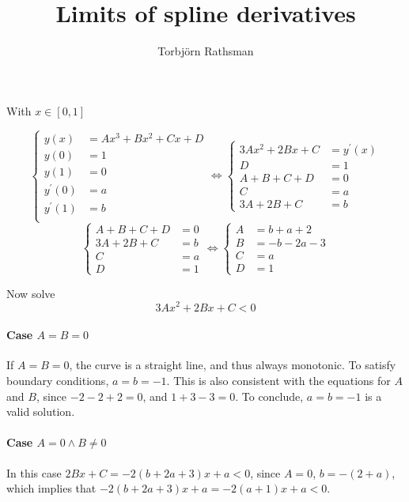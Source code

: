 \documentclass[a4paper, 11pt]{scrartcl}
\title{Limits of spline derivatives}
\author{Torbjörn Rathsman}
\begin{document}
\maketitle

With $x\in[0, 1]$

\[
\left\{
\begin{aligned}
 y(x) &= Ax^3 + Bx^2 + Cx + D\\
 y(0) &= 1\\
 y(1) &= 0\\
 y^\prime(0) &= a \\
 y^\prime(1) &= b \\
\end{aligned}
\right.
\iff
\left\{
\begin{aligned}
3Ax^2 + 2Bx + C &= y^\prime(x)\\
D &= 1 \\
A + B + C + D &= 0 \\
C &= a \\
3A + 2B + C &= b
\end{aligned}
\right.
\]
\[
 \left\{
\begin{aligned}
A + B + C + D &= 0 \\
3A + 2B + C &= b \\
C &= a \\
D &= 1
\end{aligned}
\right.
\iff
\left\{
\begin{aligned}
A&=b+a+2\\
B&=-b-2a-3\\
C&=a\\
D&=1
\end{aligned}
\right.
\]

Now solve
\[
 3Ax^2 + 2Bx + C < 0
\]

\paragraph{Case $A=B=0$}
If $A = B = 0$, the curve is a straight line, and thus always monotonic. To satisfy boundary conditions, $a = b = -1$. This is also consistent with the equations for $A$ and $B$, since $-2 - 2 + 2 = 0$, and $1 + 3 - 3 = 0$. To conclude, $a = b = -1$ is a valid solution.

\paragraph{Case $A=0\land B\neq 0$}
In this case $2Bx + C = -2\left(b + 2a + 3\right)x + a < 0$, since $A = 0$, $b = -(2 + a)$, which implies that $-2\left(b + 2a + 3\right)x + a = -2\left(a + 1\right)x + a < 0$.
\end{document}
